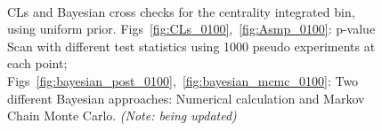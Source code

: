 \begin{figure}[hbtp]
  \begin{center}
    \\
    \caption{CLs and Bayesian cross checks for the centrality integrated bin, using uniform prior. Figs~\ref{fig:CLs_0100},~\ref{fig:Asmp_0100}: p-value Scan with different test statistics using 1000 pseudo experiments at each point; Figs~\ref{fig:bayesian_post_0100},~\ref{fig:bayesian_mcmc_0100}: Two different Bayesian approaches: Numerical calculation and Markov Chain Monte Carlo. \emph{(Note: being updated)}}
    \label{fig:limits_xchecks}
  \end{center}
\end{figure}



